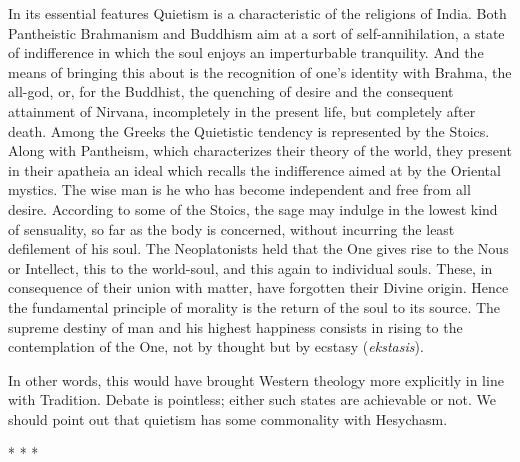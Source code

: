 \begin{quotex}
In its essential features Quietism is a characteristic of the religions of India. Both Pantheistic Brahmanism and Buddhism aim at a sort of self-annihilation, a state of indifference in which the soul enjoys an imperturbable tranquility. And the means of bringing this about is the recognition of one's identity with Brahma, the all-god, or, for the Buddhist, the quenching of desire and the consequent attainment of Nirvana, incompletely in the present life, but completely after death. Among the Greeks the Quietistic tendency is represented by the Stoics. Along with Pantheism, which characterizes their theory of the world, they present in their apatheia an ideal which recalls the indifference aimed at by the Oriental mystics. The wise man is he who has become independent and free from all desire. According to some of the Stoics, the sage may indulge in the lowest kind of sensuality, so far as the body is concerned, without incurring the least defilement of his soul. The Neoplatonists held that the One gives rise to the Nous or Intellect, this to the world-soul, and this again to individual souls. These, in consequence of their union with matter, have forgotten their Divine origin. Hence the fundamental principle of morality is the return of the soul to its source. The supreme destiny of man and his highest happiness consists in rising to the contemplation of the One, not by thought but by ecstasy (\emph{ekstasis}). 

\end{quotex}
In other words, this would have brought Western theology more explicitly in line with Tradition. Debate is pointless; either such states are achievable or not. We should point out that quietism has some commonality with Hesychasm.




\begin{center}* * *\end{center}

